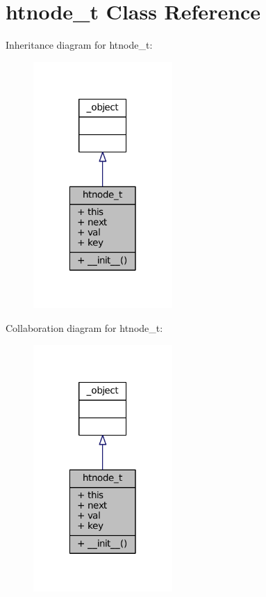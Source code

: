 \hypertarget{classlibntoh_1_1htnode__t}{\section{htnode\-\_\-t Class Reference}
\label{classlibntoh_1_1htnode__t}
}


Inheritance diagram for htnode\-\_\-t\-:
\nopagebreak
\begin{figure}[H]
\begin{center}
\leavevmode
\includegraphics[width=150pt]{classlibntoh_1_1htnode__t__inherit__graph}
\end{center}
\end{figure}


Collaboration diagram for htnode\-\_\-t\-:
\nopagebreak
\begin{figure}[H]
\begin{center}
\leavevmode
\includegraphics[width=150pt]{classlibntoh_1_1htnode__t__coll__graph}
\end{center}
\end{figure}
